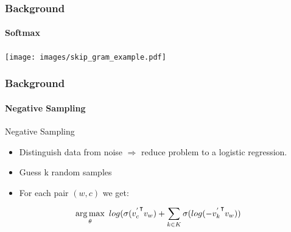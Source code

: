 \fi
\begin{frame}\frametitle{Background}\framesubtitle{Softmax}
\centerline{
\texttt{[image: images/skip\_gram\_example.pdf]}}
\end{frame}
\begin{frame}\frametitle{Background}\framesubtitle{Negative Sampling}
\begin{large}
Negative Sampling
\end{large}
\begin{itemize}
\item Distinguish data from noise $\Rightarrow$ reduce problem to a logistic regression. 
\item Guess k random samples 
\item For each pair $(w,c)$ we get:
\medskip
\end{itemize}
  \begin{equation}
 \argmax_{\theta }\ log(\sigma({v^{'}_c}^\intercal v_w ) + \sum_{k\in K} \sigma(log(-{v^{'}_k}^\intercal  v_w ))  
  \end{equation}
\end{frame}